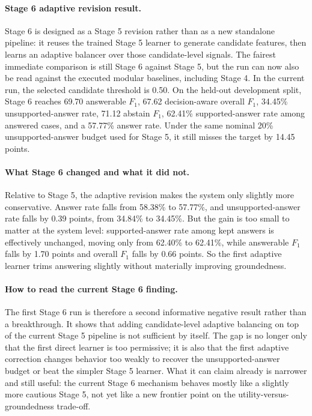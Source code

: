 \paragraph{Stage 6 adaptive revision result.}
Stage 6 is designed as a Stage 5 revision rather than as a new standalone
pipeline:
it reuses the trained Stage 5 learner to generate candidate features, then
learns an adaptive balancer over those candidate-level signals.
The fairest immediate comparison is still Stage 6 against Stage 5, but the run
can now also be read against the executed modular baselines, including Stage 4.
In the current run, the selected candidate threshold is 0.50.
On the held-out development split, Stage 6 reaches 69.70 answerable $F_1$,
67.62 decision-aware overall $F_1$, 34.45\% unsupported-answer rate, 71.12
abstain $F_1$, 62.41\% supported-answer rate among answered cases, and a
57.77\% answer rate.
Under the same nominal 20\% unsupported-answer budget used for Stage 5, it
still misses the target by 14.45 points.

\paragraph{What Stage 6 changed and what it did not.}
Relative to Stage 5, the adaptive revision makes the system only slightly more
conservative.
Answer rate falls from 58.38\% to 57.77\%, and unsupported-answer rate falls by
0.39 points, from 34.84\% to 34.45\%.
But the gain is too small to matter at the system level:
supported-answer rate among kept answers is effectively unchanged, moving only
from 62.40\% to 62.41\%, while answerable $F_1$ falls by 1.70 points and
overall $F_1$ falls by 0.66 points.
So the first adaptive learner trims answering slightly without materially
improving groundedness.

\paragraph{How to read the current Stage 6 finding.}
The first Stage 6 run is therefore a second informative negative result rather
than a breakthrough.
It shows that adding candidate-level adaptive balancing on top of the current
Stage 5 pipeline is not sufficient by itself.
The gap is no longer only that the first direct learner is too permissive; it
is also that the first adaptive correction changes behavior too weakly to
recover the unsupported-answer budget or beat the simpler Stage 5 learner.
What it can claim already is narrower and still useful:
the current Stage 6 mechanism behaves mostly like a slightly more cautious
Stage 5, not yet like a new frontier point on the
utility-versus-groundedness trade-off.

